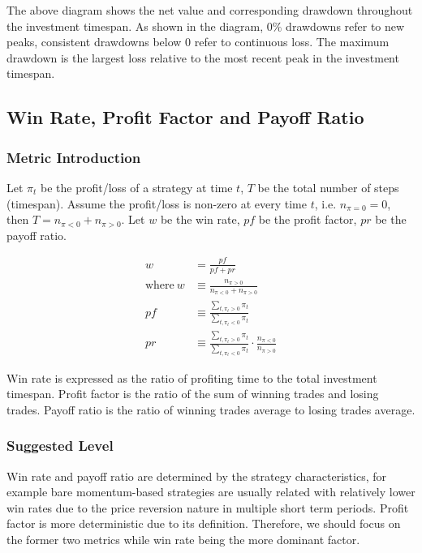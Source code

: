 \documentclass[12pt]{article}
\begin{document}
The above diagram shows the net value and corresponding drawdown throughout the investment timespan. As shown in the diagram, \(0\%\) drawdowns refer to new peaks, consistent drawdowns below 0 refer to continuous loss. The maximum drawdown is the largest loss relative to the most recent peak in the investment timespan.

\subsection{Win Rate, Profit Factor and Payoff Ratio}

\subsubsection*{Metric Introduction}

Let \(\pi_t\) be the profit/loss of a strategy at time \(t\), \(T\) be the total number of steps (timespan). Assume the profit/loss is non-zero at every time \(t\), i.e. \(n_{\pi=0} = 0\), then \(T = n_{\pi<0} + n_{\pi>0}\). Let \(w\) be the win rate, \(pf\) be the profit factor, \(pr\) be the payoff ratio.

\begin{align*}
  w &= \frac{pf}{pf+pr} \\
  \text{where}~w &\equiv \frac{n_{\pi>0}}{n_{\pi<0} + n_{\pi>0}} \\
  pf &\equiv \frac{\sum_{t, \pi_t>0} \pi_t}{\sum_{t, \pi_t<0} \pi_t} \\
  pr &\equiv \frac{\sum_{t, \pi_t>0} \pi_t}{\sum_{t, \pi_t<0} \pi_t} \cdot \frac{n_{\pi<0}}{n_{\pi>0}}
\end{align*}

Win rate is expressed as the ratio of profiting time to the total investment timespan. Profit factor is the ratio of the sum of winning trades and losing trades. Payoff ratio is the ratio of winning trades average to losing trades average.

\subsubsection*{Suggested Level}

Win rate and payoff ratio are determined by the strategy characteristics, for example bare momentum-based strategies are usually related with relatively lower win rates due to the price reversion nature in multiple short term periods. Profit factor is more deterministic due to its definition. Therefore, we should focus on the former two metrics while win rate being the more dominant factor.
\end{document}
